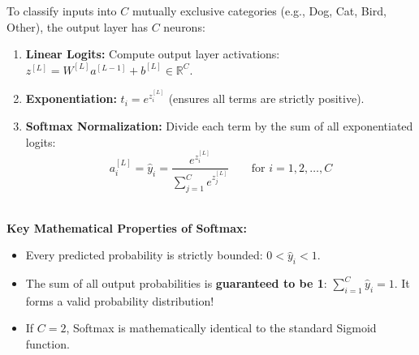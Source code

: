 \documentclass[10pt,a4paper]{article}
\begin{document}
\begin{tcolorbox}[
    colframe=accentred, colback=white, coltitle=white,
    fonttitle=\bfseries\sffamily\small,
    title={Multi-Class Classification with Softmax Activation ($C > 2$ Classes)},
    arc=1.3mm, boxrule=0.5pt, left=5pt, right=5pt, top=2pt, bottom=2pt
]
\footnotesize
To classify inputs into $C$ mutually exclusive categories (e.g., Dog, Cat, Bird, Other), the output layer has $C$ neurons:
\begin{enumerate}[leftmargin=12pt, itemsep=1pt, topsep=0.5pt]
    \item \textbf{Linear Logits:} Compute output layer activations: $z^{[L]} = W^{[L]} a^{[L-1]} + b^{[L]} \in \mathbb{R}^C$.
    \item \textbf{Exponentiation:} $t_i = e^{z_i^{[L]}}$ (ensures all terms are strictly positive).
    \item \textbf{Softmax Normalization:} Divide each term by the sum of all exponentiated logits:
    \[
    a_i^{[L]} = \hat{y}_i = \frac{e^{z_i^{[L]}}}{\sum_{j=1}^C e^{z_j^{[L]}}} \qquad \text{for } i = 1, 2, \dots, C
    \]
\end{enumerate}
\hrulefill\\[1pt]
\textbf{Key Mathematical Properties of Softmax:}
\begin{itemize}[leftmargin=8pt, itemsep=0.5pt, topsep=0pt]
    \item Every predicted probability is strictly bounded: $0 < \hat{y}_i < 1$.
    \item The sum of all output probabilities is \textbf{guaranteed to be 1}: $\sum_{i=1}^C \hat{y}_i = 1$. It forms a valid probability distribution!
    \item If $C = 2$, Softmax is mathematically identical to the standard Sigmoid function.
\end{itemize}
\end{tcolorbox}

\vspace{-2pt}
\end{document}
